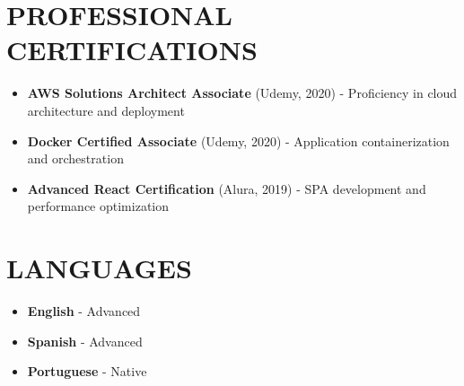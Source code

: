 \documentclass[11pt,a4paper]{article}
\begin{document}
\vspace{15pt}

\section{PROFESSIONAL CERTIFICATIONS}

\begin{itemize}[leftmargin=20pt, topsep=0pt, itemsep=2pt]
    \item \textbf{AWS Solutions Architect Associate} (Udemy, 2020) - Proficiency in cloud architecture and deployment
    \item \textbf{Docker Certified Associate} (Udemy, 2020) - Application containerization and orchestration
    \item \textbf{Advanced React Certification} (Alura, 2019) - SPA development and performance optimization
\end{itemize}

\vspace{15pt}

\section{LANGUAGES}

\begin{itemize}[leftmargin=20pt, topsep=0pt, itemsep=2pt]
    \item \textbf{English} - Advanced
    \item \textbf{Spanish} - Advanced
    \item \textbf{Portuguese} - Native
\end{itemize}
\end{document}

